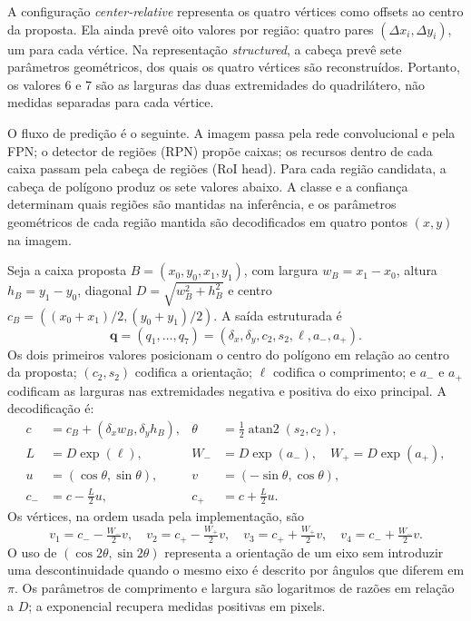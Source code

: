 \documentclass[11pt]{article}
\begin{document}
A configuração \textit{center-relative} representa os quatro vértices como offsets
ao centro da proposta. Ela ainda prevê oito valores por região: quatro pares
$(\Delta x_i,\Delta y_i)$, um para cada vértice. Na representação
\textit{structured}, a cabeça prevê sete parâmetros geométricos, dos quais os
quatro vértices são reconstruídos. Portanto, os valores 6 e 7 são as larguras das
duas extremidades do quadrilátero, não medidas separadas para cada vértice.

O fluxo de predição é o seguinte. A imagem passa pela rede convolucional e pela
FPN; o detector de regiões (RPN) propõe caixas; os recursos dentro de cada caixa
passam pela cabeça de regiões (RoI head). Para cada região candidata, a cabeça de
polígono produz os sete valores abaixo. A classe e a confiança determinam quais
regiões são mantidas na inferência, e os parâmetros geométricos de cada região
mantida são decodificados em quatro pontos $(x,y)$ na imagem.

Seja a caixa proposta $B=(x_0,y_0,x_1,y_1)$, com largura $w_B=x_1-x_0$,
altura $h_B=y_1-y_0$, diagonal $D=\sqrt{w_B^2+h_B^2}$ e centro
$c_B=((x_0+x_1)/2,(y_0+y_1)/2)$. A saída estruturada é
\[
\mathbf{q}=(q_1,\ldots,q_7)
= (\delta_x,\delta_y,c_2,s_2,\ell,a_-,a_+).
\]
Os dois primeiros valores posicionam o centro do polígono em relação ao centro
da proposta; $(c_2,s_2)$ codifica a orientação; $\ell$ codifica o comprimento;
e $a_-$ e $a_+$ codificam as larguras nas extremidades negativa e positiva do
eixo principal. A decodificação é:
\[
\begin{aligned}
 c &= c_B+(\delta_x w_B,\delta_y h_B), &
 \theta &= \tfrac12\operatorname{atan2}(s_2,c_2),\\
 L &= D\exp(\ell), &
 W_- &= D\exp(a_-),\quad W_+=D\exp(a_+),\\
 u&=(\cos\theta,\sin\theta), & v&=(-\sin\theta,\cos\theta),\\
 c_-&=c-\tfrac{L}{2}u, & c_+&=c+\tfrac{L}{2}u.
\end{aligned}
\]
Os vértices, na ordem usada pela implementação, são
\[
v_1=c_- -\tfrac{W_-}{2}v,\quad
v_2=c_+ -\tfrac{W_+}{2}v,\quad
v_3=c_+ +\tfrac{W_+}{2}v,\quad
v_4=c_- +\tfrac{W_-}{2}v.
\]
O uso de $(\cos2\theta,\sin2\theta)$ representa a orientação de um eixo sem
introduzir uma descontinuidade quando o mesmo eixo é descrito por ângulos que
diferem em $\pi$. Os parâmetros de comprimento e largura são logaritmos de
razões em relação a $D$; a exponencial recupera medidas positivas em pixels.
\end{document}
